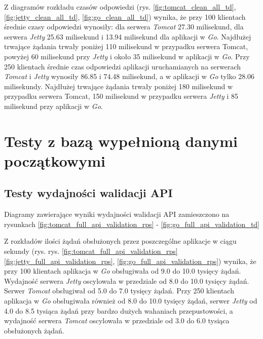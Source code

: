 Z diagramów rozkładu czasów odpowiedzi (rys. \ref{fig:tomcat_clean_all_td}, \ref{fig:jetty_clean_all_td}, \ref{fig:go_clean_all_td}) wynika, że przy 100 klientach średnie czasy odpowiedzi wynosiły: dla serwera \textsl{Tomcat} 27.30  milisekund, dla serwera \textsl{Jetty} 25.63 milisekund i 13.94 milisekund dla aplikacji w \textsl{Go}.  Najdłużej trwające żądania trwały poniżej 110 milisekund w przypadku serwera Tomcat, powyżej 60 milisekund przy \textsl{Jetty} i około 35 milisekund  w aplikacji w \textsl{Go}. Przy 250 klientach średnie czas odpowiedzi aplikacji uruchamianych na serwerach \textsl{Tomcat} i \textsl{Jetty} wynosiły 86.85 i 74.48 milisekund, a w aplikacji w \textsl{Go} tylko 28.06 milisekundy. Najdłużej trwające żądania trwały poniżej 180 milisekund w przypadku serwera Tomcat, 150 milisekund w przypadku serwera \textsl{Jetty} i 85 milisekund przy aplikacji w \textsl{Go}. 

% 
\clearpage

\newpage
\section{Testy z bazą wypełnioną danymi początkowymi}
\subsection{Testy wydajności walidacji API}
Diagramy zawierające wyniki wydajności walidacji API zamieszczono na rysunkach \ref{fig:tomcat_full_api_validation_rps} - \ref{fig:go_full_api_validation_td}

Z rozkładów ilości żądań obsłużonych przez poszczególne aplikacje w ciągu sekundy (rys. rys. \ref{fig:tomcat_full_api_validation_rps} \ref{fig:jetty_full_api_validation_rps}, \ref{fig:go_full_api_validation_rps}) wynika, że przy 100 klientach aplikacja  w \textsl{Go} obsługiwała od 9.0 do 10.0 tysięcy żądań. Wydajność serwera  \textsl{Jetty} oscylowała w przedziale od 8.0 do 10.0 tysięcy żądań. Serwer \textsl{Tomcat} obsługiwał od 5.0 do 7.0 tysięcy żądań. Przy 250 klientach aplikacja w \textsl{Go} obsługiwała również od 8.0 do 10.0 tysięcy żądań, serwer \textsl{Jetty} od 4.0 do 8.5 tysiąca żądań przy bardzo dużych wahaniach przepustowości, a wydajność serwera \textsl{Tomcat} oscylowała w przedziale od 3.0 do 6.0 tysiąca obsłużonych żądań. 
 
